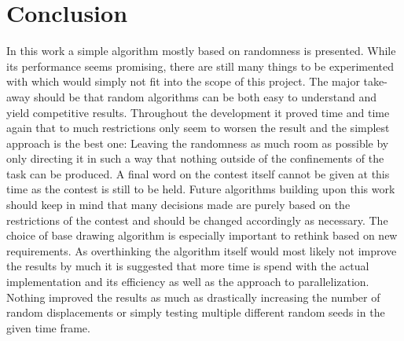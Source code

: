 \documentclass[]{llncs}
\begin{document}
    \section{Conclusion}
	In this work a simple algorithm mostly based on randomness is presented. While its performance seems promising, there are still many things to be experimented with which would simply not fit into the scope of this project. The major take-away should be that random algorithms can be both easy to understand and yield competitive results. Throughout the development it proved time and time again that to much restrictions only seem to worsen the result and the simplest approach is the best one: Leaving the randomness as much room as possible by only directing it in such a way that nothing outside of the confinements of the task can be produced. A final word on the contest itself cannot be given at this time as the contest is still to be held.
	Future algorithms building upon this work should keep in mind that many decisions made are purely based on the restrictions of the contest and should be changed accordingly as necessary. The choice of base drawing algorithm is especially important to rethink based on new requirements. As overthinking the algorithm itself would most likely not improve the results by much it is suggested that more time is spend with the actual implementation and its efficiency as well as the approach to parallelization. Nothing improved the results as much as drastically increasing the number of random displacements or simply testing multiple different random seeds in the given time frame.

    \printbibliography
\end{document}
